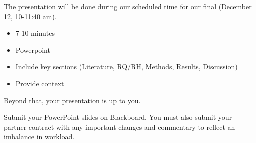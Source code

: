 \documentclass[
  b5paper]{book}
\begin{document}
The presentation will be done during our scheduled time for our final (December 12, 10-11:40 am).~

\begin{itemize}
\item
  7-10 minutes
\item
  Powerpoint
\item
  Include key sections (Literature, RQ/RH, Methods, Results, Discussion)
\item
  Provide context
\end{itemize}

Beyond that, your presentation is up to you.

Submit your PowerPoint slides on Blackboard. You must also submit your partner contract with any important changes and commentary to reflect an imbalance in workload.

  
\end{document}
